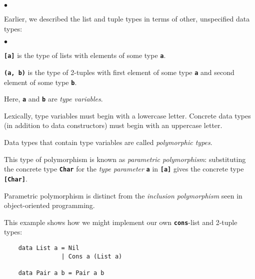 \documentclass[12pt]{article}
\newcommand\code[1]{\texttt{\textbf{#1}}}
\newenvironment{notelist}{\begin{list}
   {$\bullet$}
   {\setlength{\itemsep}{0in}}}
   {\end{list}}
\begin{document}
\begin{notelist}
    \item Earlier, we described the list and tuple types in terms of other, unspecified data types:
    \begin{notelist}
        \item \code{[a]} is the type of lists with elements of some type \code{a}.
        \item \code{(a, b)} is the type of 2-tuples with first element of some type \code{a} and second 
              element of some type \code{b}.
    \end{notelist}
    \item Here, \code{a} and \code{b} are \textit{type variables}.
    \item Lexically, type variables must begin with a lowercase letter. Concrete data types (in addition to
          data constructors) must begin with an uppercase letter.
    \item Data types that contain type variables are called \textit{polymorphic types}. 
    \item This type of polymorphism is known as \textit{parametric polymorphism}: substituting the concrete
          type \code{Char} for the \textit{type parameter} \code{a} in \code{[a]} gives the concrete type
          \code{[Char]}.
    \item Parametric polymorphism is distinct from the \textit{inclusion polymorphism} seen in object-oriented
          programming.
    \item This example shows how we might implement our own \code{cons}-list and 2-tuple types:
    \begin{lstlisting}
    data List a = Nil
                | Cons a (List a) 

    data Pair a b = Pair a b


\end{lstlisting}
\end{notelist}
\end{document}
